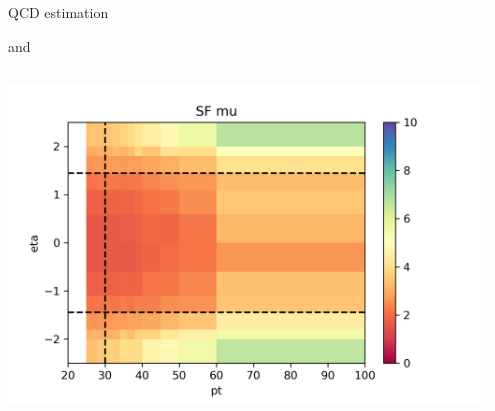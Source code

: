 \begin{frame}{QCD estimation}
\begin{block}{\cmh and \ceh}
\begin{columns}[c]
        \includegraphics[width=0.95\textwidth,trim=0 0 2cm 0, clip]{chapters/Analysis/sectionBackground/figures/ljets_kinematics/123j1b/SF_mu_2d.png}
        
    \end{columns}
    \end{block}
    
\end{frame}

    
    

    








